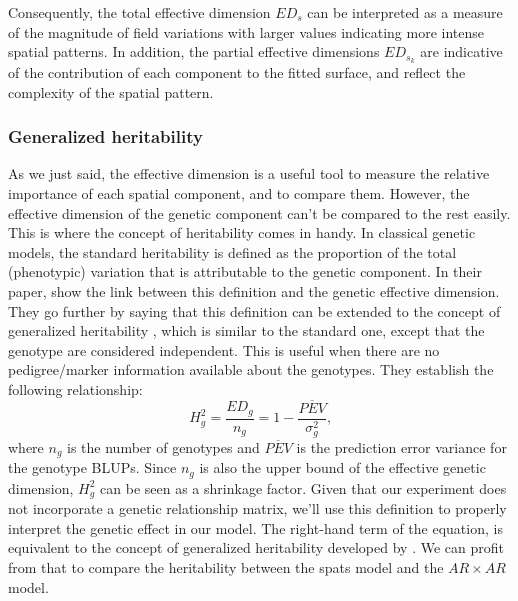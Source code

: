 Consequently, the total effective dimension $ED_{s}$ can be interpreted as a measure of the magnitude of field variations with larger values indicating more intense spatial patterns. In addition, the partial effective dimensions $ED_{s_{k}}$ are indicative of the contribution of each component to the fitted surface, and reflect the complexity of the spatial pattern.

\subsubsection{Generalized heritability}
As we just said, the effective dimension is a useful tool to measure the relative importance of each spatial component, and to compare them. However, the effective dimension of the genetic component can't be compared to the rest easily. This is where the concept of heritability comes in handy. In classical genetic models, the standard heritability is defined as the proportion of the total (phenotypic) variation that is attributable to the genetic component. In their paper, \textcite{rodriguez-alvarez_correcting_2018} show the link between this definition and the genetic effective dimension. They go further by saying that this definition can be extended to the concept of generalized heritability \parencite{oakey_joint_2006}, which is similar to the standard one, except that the genotype are considered independent. This is useful when there are no pedigree/marker information available about the genotypes. They establish the following relationship:
\begin{equation}
H_{g}^2 = \dfrac{ED_{g}}{n_{g}} = 1 - \dfrac{\overline{PEV}}{\sigma^2_{g}}
\text{,}
\end{equation}
where $n_{g}$ is the number of genotypes and $\overline{PEV}$ is the prediction error variance for the genotype BLUPs. Since $n_{g}$ is also the upper bound of the effective genetic dimension, $H^2_{g}$ can be seen as a shrinkage factor. Given that our experiment does not incorporate a genetic relationship matrix, we'll use this definition to properly interpret the genetic effect in our model. The right-hand term of the equation, is equivalent to the concept of generalized heritability developed by \textcite{welham2010comparison}. We can profit from that to compare the heritability between the spats model and the $AR \times AR$ model.

